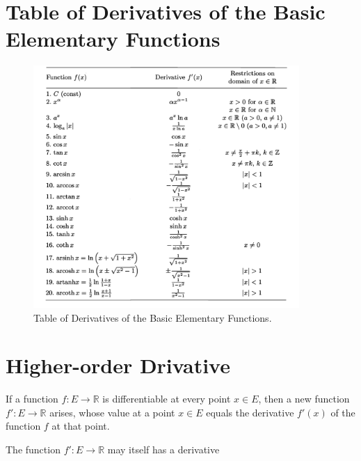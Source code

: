 \documentclass[a4paper,12pt]{article} %
\begin{document}
\section{Table of Derivatives of the Basic Elementary Functions}
\graphicspath{
        {./Figs/}
}
\begin{figure}[htbp]
        \centering
        \includegraphics[width=0.9\textwidth,height=1.2\textwidth]{tableofderi.png}
        \caption{Table of Derivatives of the Basic Elementary Functions.}
        \label{fig:hyps}
\end{figure}

\section{Higher-order Drivative}
If a function $f: E \to \mathbb{R}$ is differentiable at every point $x \in E$,
then a new function $f': E \to \mathbb{R}$ arises, whose value at a point 
$x \in E$ equals the derivative $f'(x)$ of the function $f$ at that point.

The function $f': E \to \mathbb{R}$ may itself has a derivative $$
\end{document}
